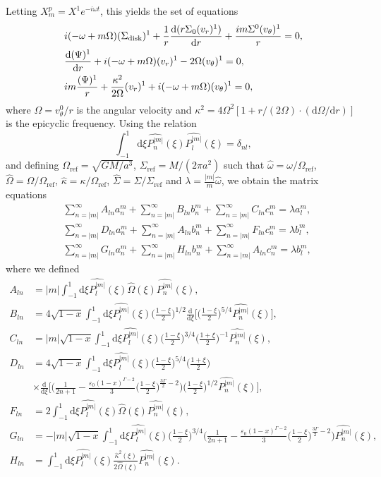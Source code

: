 \documentclass[11pt]{article}
\newcommand{\rd}{\mathrm{d}}
\newcommand{\vr}{v_{r}}
\newcommand{\vt}{v_{\theta}}
\newcommand{\Sigmad}{\Sigma_{\rm{disk}}}
\newcommand{\anm}{a_n^m}
\newcommand{\bnm}{b_n^m}
\newcommand{\cnm}{c_n^m}
\newcommand{\alm}{a_l^m}
\newcommand{\blm}{b_l^m}
\newcommand{\Pnm}{P_n^{|m|}}
\newcommand{\Plm}{P_l^{|m|}}
\newcommand{\hPnm}{\widehat{\Pnm}}
\newcommand{\hPlm}{\widehat{\Plm}}
\newcommand{\homega}{\widehat{\omega}}
\newcommand{\hOmega}{\widehat{\Omega}}
\newcommand{\Omegaref}{\Omega_{\mathrm{ref}}}
\newcommand{\hkappa}{\widehat{\kappa}}
\newcommand{\Sigmaref}{\Sigma_{\mathrm{ref}}}
\newcommand{\hSigma}{\widehat{\Sigma}}
\begin{document}
Letting $X_m^p = X^1  e^{-i \omega t}$, this yields the set of equations
\begin{align}
&i(-\omega + m \Omega)(\Sigmad)^1 + \frac{1}{r} \frac{\rd (r\Sigma_0 (\vr)^1)}{\rd r} + \frac{im\Sigma^0 (\vt)^1}{r} = 0,\\
&\frac{\rd (\Psi)^1}{\rd r} + i(-\omega + m \Omega)(\vr)^1 - 2 \Omega (\vt)^1 = 0,\\
&i m \frac{(\Psi)^1}{r} + \frac{\kappa^2}{2\Omega} (\vr)^1 + i(-\omega + m \Omega)(\vt)^1 = 0,
\end{align}
where $\Omega = \vt^0/r$ is the angular velocity and $\kappa^2=4\Omega^2[1+r/(2\Omega)\cdot(\rd \Omega /\rd r)]$ is the epicyclic frequency. Using the relation 
$$\int_{-1}^{1} \rd \xi \hPnm(\xi)\hPlm(\xi) = \delta_{nl},$$
and defining $\Omegaref=\sqrt{GM/a^3 }$, $\Sigmaref=M/(2\pi a^2)$   such that $\homega = \omega/\Omegaref$, $\hOmega = \Omega/\Omegaref$, $\hkappa = \kappa/\Omegaref$, $\hSigma=\Sigma/\Sigmaref$ and $\lambda=\frac{|m|}{m}\homega$, we obtain the matrix equations
\begin{align}
&\sum_{n=|m|}^{\infty}  A_{ln} \anm  +\sum_{n=|m|}^{\infty}  B_{ln}\bnm+\sum_{n=|m|}^{\infty}  C_{ln}\cnm= \lambda \alm ,\\
&\sum_{n=|m|}^{\infty}D_{ln}\anm + \sum_{n=|m|}^{\infty}   A_{ln} \bnm+  \sum_{n=|m|}^{\infty} F_{ln} \cnm  =  \lambda    \blm ,\\
&\sum_{n=|m|}^{\infty}G_{ln}\anm + \sum_{n=|m|}^{\infty}   H_{ln} \bnm+  \sum_{n=|m|}^{\infty} A_{ln} \cnm  =  \lambda    \blm ,
 \end{align}
where we defined
\begin{align}
A_{ln} &= |m| \int_{-1}^{1} \rd \xi  \hPlm(\xi)\hOmega(\xi)\hPnm(\xi) , \\
B_{ln} &= 4 {\sqrt{1-x}} \int_{-1}^{1} \rd \xi  \hPlm(\xi) \bigg(\frac{1-\xi}{2}\bigg)^{1/2} \frac{\rd}{\rd \xi} \bigg[\bigg(\frac{1-\xi}{2}\bigg)^{5/4}\hPnm(\xi)\bigg], \\
C_{ln} &= |m| {\sqrt{1-x}} \int_{-1}^{1} \rd \xi \hPlm(\xi) \bigg(\frac{1-\xi}{2}\bigg)^{3/4}\bigg(\frac{1+\xi}{2}\bigg)^{-1}   \hPnm(\xi), \\
D_{ln} &= 4 {\sqrt{1-x}} \int_{-1}^{1} \rd \xi \hPlm(\xi)  \bigg(\frac{1-\xi}{2}\bigg)^{5/4} \bigg(\frac{1+\xi}{2}\bigg) \\
&\times\frac{\rd}{\rd \xi} \bigg[\bigg(\frac{1}{2n+1}-\frac{\varepsilon_0(1-x)^{\Gamma-2} }{3} \bigg(\frac{1-\xi}{2}\bigg)^{\frac{3\Gamma}{2}-2} \bigg) \bigg(\frac{1-\xi}{2}\bigg)^{1/2}\hPnm(\xi) \bigg] ,\\
F_{ln} &=2  \int_{-1}^{1} \rd \xi  \hPlm(\xi)\hOmega(\xi)\hPnm(\xi) , \\
G_{ln} &= -|m|{\sqrt{1-x}} \int_{-1}^{1} \rd \xi \hPlm(\xi)  \bigg(\frac{1-\xi}{2}\bigg)^{3/4} 
\bigg(\frac{1}{2n+1}-\frac{\varepsilon_0(1-x)^{\Gamma-2} }{3} \bigg(\frac{1-\xi}{2}\bigg)^{\frac{3\Gamma}{2}-2} \bigg) \hPnm(\xi)  ,\\
H_{ln} &= \int_{-1}^{1} \rd \xi  \hPlm(\xi)\frac{\hkappa^2(\xi)}{2\hOmega(\xi)}\hPnm(\xi) .
\end{align}
\end{document}
